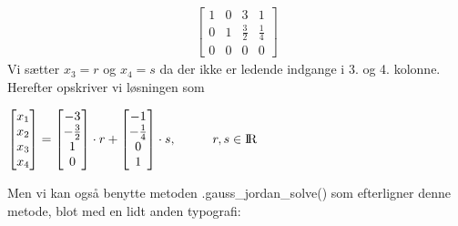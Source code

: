 \documentclass[letterpaper,10pt,english]{jupyterBook}
\begin{document}
\begin{sphinxVerbatim}[commandchars=\\\{\}]
  \PYG{p}{[}\PYG{p}{[}   \PYG{p}{]} \PYG{p}{[}   \PYG{p}{]} \PYG{p}{[}   \PYG{p}{]}\PYG{p}{]}
\PYG{p}{[}\PYG{p}{]}
\end{sphinxVerbatim}
\begin{equation*}
\begin{split}\displaystyle \left[\begin{matrix}1 & 0 & 3 & 1\\0 & 1 & \frac{3}{2} & \frac{1}{4}\\0 & 0 & 0 & 0\end{matrix}\right]\end{split}
\end{equation*}
Vi sætter \(x_3 = r\) og \(x_4 = s\) da der ikke er ledende indgange i 3. og 4. kolonne. Herefter opskriver vi løsningen som

\(   \displaystyle \left[\begin{matrix}x_{1}\\x_{2}\\x_{3}\\x_4\end{matrix}\right] = 
    \displaystyle \left[\begin{matrix}-3\\-\frac32\\1\\0\end{matrix}\right]\cdot r +
    \displaystyle \left[\begin{matrix}-1\\-\frac14\\0\\1\end{matrix}\right]\cdot s, \hspace{1cm}r,s\in {\rm I\!R}\)

Men vi kan også benytte metoden .gauss\_jordan\_solve() som efterligner denne metode, blot med en lidt anden typografi:
\end{document}
